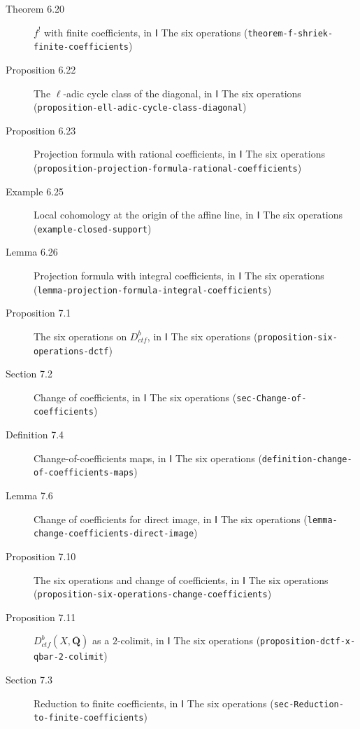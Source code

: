\documentclass[11pt]{article}
\newcommand{\bpslug}[1]{\texttt{#1}}
\providecommand{\Dctf}{}\renewcommand{\Dctf}{D^b_{ctf}}
\providecommand{\Qbar}{}\renewcommand{\Qbar}{\overline{\mathbf Q}}
\begin{document}
\begin{description}
\item[Theorem 6.20] $f^!$ with finite coefficients, in Ⅰ The six operations (\bpslug{theorem-{}\allowbreak{}f-{}\allowbreak{}shriek-{}\allowbreak{}finite-{}\allowbreak{}coefficients})
\item[Proposition 6.22] The $\ell$-adic cycle class of the diagonal, in Ⅰ The six operations (\bpslug{proposition-{}\allowbreak{}ell-{}\allowbreak{}adic-{}\allowbreak{}cycle-{}\allowbreak{}class-{}\allowbreak{}diagonal})
\item[Proposition 6.23] Projection formula with rational coefficients, in Ⅰ The six operations (\bpslug{proposition-{}\allowbreak{}projection-{}\allowbreak{}formula-{}\allowbreak{}rational-{}\allowbreak{}coefficients})
\item[Example 6.25] Local cohomology at the origin of the affine line, in Ⅰ The six operations (\bpslug{example-{}\allowbreak{}closed-{}\allowbreak{}support})
\item[Lemma 6.26] Projection formula with integral coefficients, in Ⅰ The six operations (\bpslug{lemma-{}\allowbreak{}projection-{}\allowbreak{}formula-{}\allowbreak{}integral-{}\allowbreak{}coefficients})
\item[Proposition 7.1] The six operations on $\Dctf$, in Ⅰ The six operations (\bpslug{proposition-{}\allowbreak{}six-{}\allowbreak{}operations-{}\allowbreak{}dctf})
\item[Section 7.2] Change of coefficients, in Ⅰ The six operations (\bpslug{sec-{}\allowbreak{}Change-{}\allowbreak{}of-{}\allowbreak{}coefficients})
\item[Definition 7.4] Change-of-coefficients maps, in Ⅰ The six operations (\bpslug{definition-{}\allowbreak{}change-{}\allowbreak{}of-{}\allowbreak{}coefficients-{}\allowbreak{}maps})
\item[Lemma 7.6] Change of coefficients for direct image, in Ⅰ The six operations (\bpslug{lemma-{}\allowbreak{}change-{}\allowbreak{}coefficients-{}\allowbreak{}direct-{}\allowbreak{}image})
\item[Proposition 7.10] The six operations and change of coefficients, in Ⅰ The six operations (\bpslug{proposition-{}\allowbreak{}six-{}\allowbreak{}operations-{}\allowbreak{}change-{}\allowbreak{}coefficients})
\item[Proposition 7.11] $\Dctf(X,\Qbar)$ as a $2$-colimit, in Ⅰ The six operations (\bpslug{proposition-{}\allowbreak{}dctf-{}\allowbreak{}x-{}\allowbreak{}qbar-{}\allowbreak{}2-{}\allowbreak{}colimit})
\item[Section 7.3] Reduction to finite coefficients, in Ⅰ The six operations (\bpslug{sec-{}\allowbreak{}Reduction-{}\allowbreak{}to-{}\allowbreak{}finite-{}\allowbreak{}coefficients})

\end{description}
\end{document}
